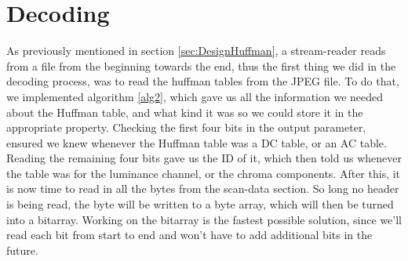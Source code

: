 \section{Decoding}
As previously mentioned in section \ref{sec:DesignHuffman}, a stream-reader reads from a file from the beginning towards the end, thus the first thing we did in the decoding process, was to read the huffman tables from the JPEG file. 
To do that, we implemented algorithm \ref{alg2}, which gave us all the information we needed about the Huffman table, and what kind it was so we could store it in the appropriate property. 
Checking the first four bits in the output parameter, ensured we knew whenever the Huffman table was a DC table, or an AC table. 
Reading the remaining four bits gave us the ID of it, which then told us whenever the table was for the luminance channel, or the chroma components.
After this, it is now time to read in all the bytes from the scan-data section. So long no header is being read, the byte will be written to a byte array, which will then be turned into a bitarray.
Working on the bitarray is the fastest possible solution, since we'll read each bit from start to end and won't have to add additional bits in the future.
